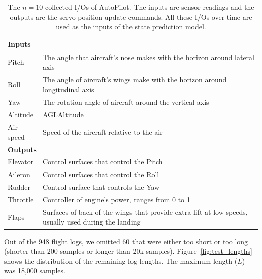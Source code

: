 \begin{table}
    \caption{The $n=10$ collected I/Os of AutoPilot. The inputs are sensor readings and the outputs are the servo position update commands. All these I/Os over time are used as the inputs of the state prediction model.}
    \label{tab:in_outs}
    \centering
\begin{tabularx}{\columnwidth}{lX}
                                                                                                                    \toprule
\multicolumn{2}{l}{\textbf{Inputs}}                                                                              \\ \midrule
Pitch     & The angle that aircraft's nose makes with the horizon around lateral axis                            \\ 
Roll      & The angle of aircraft's wings make with the horizon around longitudinal axis                         \\ 
Yaw       & The rotation angle of aircraft around the vertical axis                                              \\ 
Altitude  & AGL\footnotemark Altitude                                                                            \\ 
Air speed & Speed of the aircraft relative to the air                                                            \\ \midrule
\multicolumn{2}{l}{\textbf{Outputs}}                                                                             \\ \midrule
Elevator  & Control surfaces that control the Pitch                                                              \\ 
Aileron   & Control surfaces that control the Roll                                                               \\ 
Rudder    & Control surface that controls the Yaw                                                                \\ 
Throttle  & Controller of engine's power, ranges from 0 to 1                                                     \\ 
Flaps     & Surfaces of back of the wings that provide extra lift at low speeds, usually used during the landing \\ \bottomrule
\end{tabularx}
\end{table}
Out of the 948 flight logs, we omitted 60 that were either too short or too long (shorter than 200 samples or longer than 20k samples). Figure~\ref{fig:test_lengths} shows the distribution of the remaining log lengths. The maximum length ($L$) was 18,000 samples.

